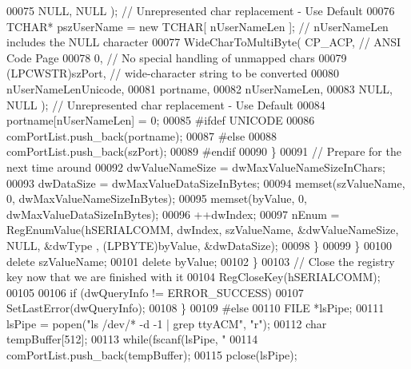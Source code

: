 \begin{DoxyCode}
00075                         NULL, NULL ); \textcolor{comment}{// Unrepresented char replacement - Use Default}
00076                         TCHAR* pszUserName = \textcolor{keyword}{new} TCHAR[ nUserNameLen ]; \textcolor{comment}{// nUserNameLen includes the NULL
       character}
00077                         WideCharToMultiByte( CP\_ACP, \textcolor{comment}{// ANSI Code Page}
00078                         0, \textcolor{comment}{// No special handling of unmapped chars}
00079                         (LPCWSTR)szPort, \textcolor{comment}{// wide-character string to be converted}
00080                         nUserNameLenUnicode,
00081                         portname,
00082                         nUserNameLen,
00083                         NULL, NULL ); \textcolor{comment}{// Unrepresented char replacement - Use Default}
00084                         portname[nUserNameLen] = 0;
00085 \textcolor{preprocessor}{#ifdef UNICODE}
00086                         comPortList.push\_back(portname);
00087 \textcolor{preprocessor}{#else}
00088                         comPortList.push\_back(szPort);
00089 \textcolor{preprocessor}{#endif}
00090                     \}
00091                     \textcolor{comment}{// Prepare for the next time around}
00092                     dwValueNameSize = dwMaxValueNameSizeInChars;
00093                     dwDataSize = dwMaxValueDataSizeInBytes;
00094                     memset(szValueName, 0, dwMaxValueNameSizeInBytes);
00095                     memset(byValue, 0, dwMaxValueDataSizeInBytes);
00096                     ++dwIndex;
00097                     nEnum = RegEnumValue(hSERIALCOMM, dwIndex, szValueName, &dwValueNameSize, NULL, &dwType
      , (LPBYTE)byValue, &dwDataSize);
00098                 \}
00099             \}
00100             \textcolor{keyword}{delete} szValueName;
00101             \textcolor{keyword}{delete} byValue;
00102         \}
00103         \textcolor{comment}{// Close the registry key now that we are finished with it}
00104         RegCloseKey(hSERIALCOMM);
00105 
00106         \textcolor{keywordflow}{if} (dwQueryInfo != ERROR\_SUCCESS)
00107             SetLastError(dwQueryInfo);
00108     \}
00109 \textcolor{preprocessor}{#else}
00110     FILE *lsPipe;
00111     lsPipe = popen(\textcolor{stringliteral}{"ls /dev/* -d -1 | grep ttyACM"}, \textcolor{stringliteral}{"r"});
00112     \textcolor{keywordtype}{char} tempBuffer[512];
00113     \textcolor{keywordflow}{while}(fscanf(lsPipe, \textcolor{stringliteral}{"%
00114         comPortList.push\_back(tempBuffer);
00115     pclose(lsPipe);
}
\end{DoxyCode}
